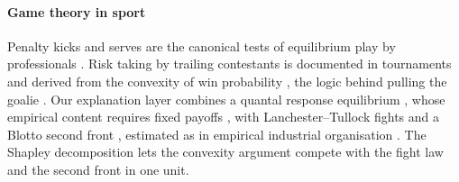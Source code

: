 \paragraph*{Game theory in sport}
Penalty kicks and serves are the canonical tests of equilibrium play by professionals \citep{walker2001minimax,chiappori2002testing,palacios2003professionals}.
Risk taking by trailing contestants is documented in tournaments \citep{genakos2012interim} and derived from the convexity of win probability \citep{cabral2003rd,skinner2011scoring}, the logic behind pulling the goalie \citep{beaudoin2010pulling}.
Our explanation layer combines a quantal response equilibrium \citep{mckelvey1995quantal}, whose empirical content requires fixed payoffs \citep{haile2008empirical}, with Lanchester--Tullock fights \citep{lanchester1916aircraft,tullock1980efficient} and a Blotto second front \citep{roberson2006colonel}, estimated as in empirical industrial organisation \citep{aguirregabiria2007sequential}.
The Shapley decomposition \citep{shapley1953value} lets the convexity argument compete with the fight law and the second front in one unit.

